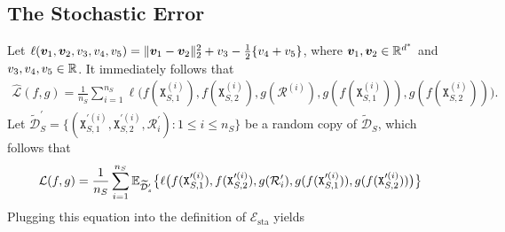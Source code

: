 \subsection{The Stochastic Error}\label{subsection: The Stochastic Error}
Let $\ell(\bm{v}_1, \bm{v}_2, v_3, v_4, v_5) = \Vert{\bm{v}_1 - \bm{v}_2}\Vert_2^2 + v_3 - \frac{1}{2}\{v_4 + v_5\}$, where $\bm{v}_1,\bm{v}_2 \in \mathbb{R}^{d^*}$ and $v_3, v_4, v_5 \in \mathbb{R}$. It immediately follows that 
\begin{align*}
    \widehat{\mathcal{L}}(f,g) = \frac{1}{n_S}\sum_{i=1}^{n_S}\ell\big(f(\mathtt{X}^{(i)}_{S,1}), f(\mathtt{X}^{(i)}_{S,2}), g(\mathcal{R}^{(i)}), g(f(\mathtt{X}^{(i)}_{S,1})), g(f(\mathtt{X}^{(i)}_{S,2}))\big).
\end{align*}
Let $\widetilde{\mathcal{D}}^\prime_S = \{(\mathtt{X}_{S,1}^{\prime(i)}, \mathtt{X}_{S,2}^{\prime(i)}, \mathcal{R}^\prime_i): 1 \leq i \leq n_S\}$ be a random copy of $\widetilde{\mathcal{D}}_S$, which follows that 
\begin{align*}
    \mathcal{L}(f,g) = \frac{1}{n_S}\sum_{i=1}^{n_S}\mathbb{E}_{\widetilde{\mathcal{D}}^\prime_s}\big\{\ell\big(f(\mathtt{X}_{S,1}^{\prime(i)}), f(\mathtt{X}_{S,2}^{\prime(i)}), g(\mathcal{R}^\prime_i), g(f(\mathtt{X}_{S,1}^{\prime(i)})), g(f(\mathtt{X}_{S,2}^{\prime(i)}))\big)\big\}
\end{align*}
Plugging this equation into the definition of $\mathcal{E}_{\mathrm{sta}}$ yields
